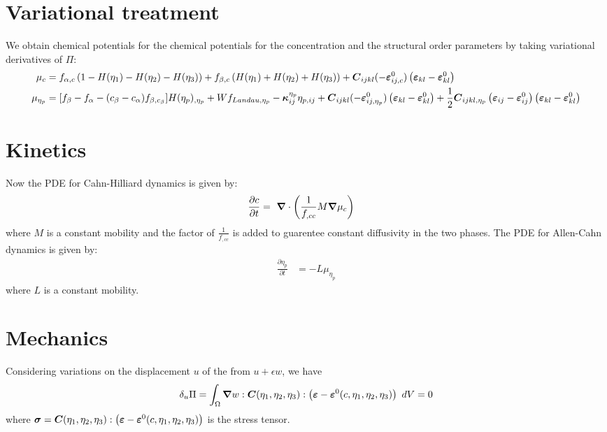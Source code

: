 \documentclass[11pt]{article}
\newcommand{\gv}[1]{\ensuremath{\mbox{\boldmath$ #1 $}}}
\newcommand{\grad}[1]{\gv{\nabla} #1} %
\renewcommand{\=}[1]{\stackrel{#1}{=}} %
\theoremstyle{definition}
\theoremstyle{remark}
\def\Bkappa{\mbox{\boldmath$\kappa$}}
\def\Bsigma{\mbox{\boldmath$\sigma$}}
\def\Bvarepsilon{\mbox{\boldmath$\varepsilon$}}
\def\bC{\mbox{\boldmath$ C$}}
\begin{document}
\section{Variational treatment}
We obtain chemical potentials for the chemical potentials for the concentration and the structural order parameters by taking variational derivatives of $\Pi$:
\begin{align}
  \mu_{c}  &= f_{\alpha,c} \left( 1- H(\eta_1)-H(\eta_2)-H(\eta_3)\right) +f_{\beta,c} \left(  H(\eta_1)  + H(\eta_2) + H(\eta_3) \right)  + \bC_{ijkl} (- \Bvarepsilon^0_{ij,c}) \left( \Bvarepsilon_{kl} - \Bvarepsilon^0_{kl}\right) \\
  \mu_{\eta_p}  &= [ f_{\beta}-f_{\alpha} -(c_{\beta}-c_{\alpha}) f_{\beta,c_{\beta}}] H(\eta_p)_{,\eta_p} + W f_{Landau,\eta_p}- \Bkappa^{\eta_p}_{ij} \eta_{p,ij} + \bC_{ijkl} (- \Bvarepsilon^0_{ij,\eta_p}) \left( \Bvarepsilon_{kl} - \Bvarepsilon^0_{kl}\right) + \frac{1}{2} \bC_{ijkl,\eta_p} \left( \Bvarepsilon_{ij} - \Bvarepsilon ^0_{ij} \right) \left( \Bvarepsilon_{kl} - \Bvarepsilon^0_{kl}\right)
\end{align}

\section{Kinetics}
Now the PDE for Cahn-Hilliard dynamics is given by:
\begin{align}
  \frac{\partial c}{\partial t} &= ~\grad \cdot \left( \frac{1}{f_{,cc}}M \grad \mu_c \right) \label{CH_eqn}
  \end{align}
  where $M$ is a constant mobility and the factor of $\frac{1}{f_{,cc}}$ is added to guarentee constant diffusivity in the two phases. The PDE for Allen-Cahn dynamics is given by:
  \begin{align}
    \frac{\partial \eta_p}{\partial t} &= - L \mu_{\eta_p} \label{AC_eqn}
\end{align}
where  $L$ is a constant mobility. 

\section{Mechanics}
Considering variations on the displacement $u$ of the from $u+\epsilon w$, we have
\begin{align}
\delta_u \Pi &=  \int_{\Omega}   \grad w :  \bC(\eta_1, \eta_2, \eta_3) : \left( \Bvarepsilon - \Bvarepsilon^0(c,\eta_1, \eta_2, \eta_3)\right) ~dV = 0 \\
\end{align}
where $\Bsigma = \bC(\eta_1, \eta_2, \eta_3) : \left( \Bvarepsilon - \Bvarepsilon^0(c,\eta_1, \eta_2, \eta_3)\right)$ is the stress tensor. \\
\end{document}
